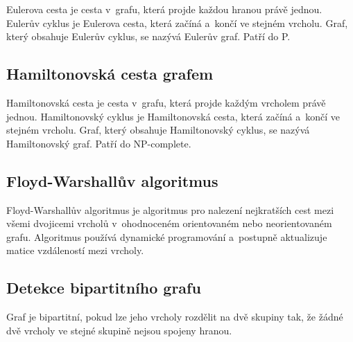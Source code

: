 Eulerova cesta je cesta v~grafu, která projde každou hranou právě jednou. Eulerův cyklus je Eulerova cesta, která začíná a~končí ve stejném vrcholu. Graf, který obsahuje Eulerův cyklus, se nazývá Eulerův graf. Patří do P.

\subsection{Hamiltonovská cesta grafem}

Hamiltonovská cesta je cesta v~grafu, která projde každým vrcholem právě jednou. Hamiltonovský cyklus je Hamiltonovská cesta, která začíná a~končí ve stejném vrcholu. Graf, který obsahuje Hamiltonovský cyklus, se nazývá Hamiltonovský graf. Patří do NP-complete.

\subsection{Floyd-Warshallův algoritmus}

Floyd-Warshallův algoritmus je algoritmus pro nalezení nejkratších cest mezi všemi dvojicemi vrcholů v~ohodnoceném orientovaném nebo neorientovaném grafu. Algoritmus používá dynamické programování a~postupně aktualizuje matice vzdáleností mezi vrcholy.


\subsection{Detekce bipartitního grafu}

Graf je bipartitní\footnotemark[1], pokud lze jeho vrcholy rozdělit na dvě skupiny tak, že žádné dvě vrcholy ve stejné skupině nejsou spojeny hranou.


